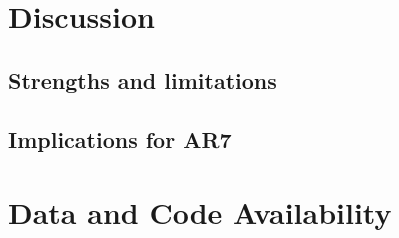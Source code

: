 \documentclass[11pt]{article}
\begin{document}
\section{Discussion}

\subsection{Strengths and limitations}
%
%

\subsection{Implications for AR7}
%


\section{Data and Code Availability}
\end{document}
